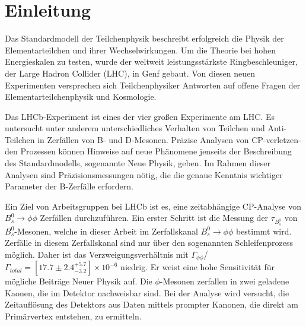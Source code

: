 \documentclass{article}
\begin{document}
\section{Einleitung}
Das Standardmodell der Teilchenphysik beschreibt erfolgreich die Physik der Elementarteilchen und ihrer Wechselwirkungen. Um die Theorie bei hohen Energieskalen zu testen, wurde der weltweit leistungsstärkste Ringbeschleuniger, der Large Hadron Collider (LHC), in Genf gebaut. Von diesen neuen Experimenten versprechen sich Teilchenphysiker Antworten auf offene Fragen der Elementarteilchenphysik und Kosmologie.

Das LHCb-Experiment ist eines der vier großen Experimente am LHC. Es untersucht unter anderem unterschiedliches Verhalten von Teilchen und Anti-Teilchen in Zerfällen von B- und D-Mesonen. Präzise Analysen von CP-verletzen-den Prozessen können Hinweise auf neue Phänomene jenseits der Beschreibung des Standardmodells, sogenannte Neue Physik, geben. %
Im Rahmen dieser Analysen sind Präzisionsmessungen nötig, die die genaue Kenntnis wichtiger Parameter der B-Zerfälle erfordern.

Ein Ziel von Arbeitsgruppen bei LHCb ist es, eine zeitabhängige CP-Analyse von $B_s^0\rightarrow\phi\phi$ Zerfällen durchzuführen. Ein erster Schritt ist die Messung der  $\tau_{B_s^0}$ von $B_s^0$-Mesonen, welche in dieser Arbeit im Zerfallskanal $B_s^0\rightarrow \phi \phi$ bestimmt wird. Zerfälle in diesem Zerfallskanal sind nur über den sogenannten Schleifenprozess möglich. Daher ist das Verzweigungsverhältnis mit $\Gamma_{\phi \phi}$/$\Gamma_{total}=[17.7\pm2.4 ^{+5.7}_{-3.2}]\times 10^{-6}$  \cite{PDG} %
niedrig. Er weist eine hohe Sensitivität für mögliche Beiträge Neuer Physik auf. Die $\phi$-Mesonen zerfallen in zwei geladene Kaonen, die im Detektor nachweisbar sind. Bei der Analyse wird versucht, die Zeitauflösung des Detektors aus Daten mittels prompter Kanonen, die direkt am Primärvertex entstehen, zu ermitteln.%
\end{document}
